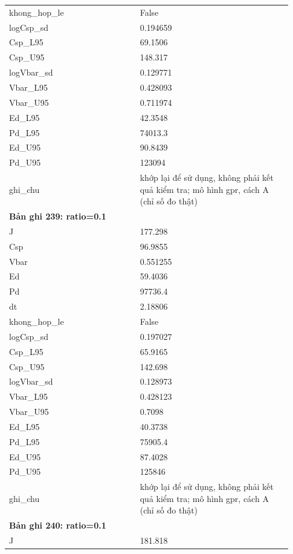 \begin{longtable}{p{0.43\linewidth}p{0.50\linewidth}}
khong\_\allowbreak hop\_\allowbreak le & False \\
logCsp\_\allowbreak sd & 0.194659 \\
Csp\_\allowbreak L95 & 69.1506 \\
Csp\_\allowbreak U95 & 148.317 \\
logVbar\_\allowbreak sd & 0.129771 \\
Vbar\_\allowbreak L95 & 0.428093 \\
Vbar\_\allowbreak U95 & 0.711974 \\
Ed\_\allowbreak L95 & 42.3548 \\
Pd\_\allowbreak L95 & 74013.3 \\
Ed\_\allowbreak U95 & 90.8439 \\
Pd\_\allowbreak U95 & 123094 \\
ghi\_\allowbreak chu & khớp lại để sử dụng, không phải kết quả kiểm tra; mô hình gpr, cách A (chỉ số đo thật) \\
\midrule
\multicolumn{2}{p{0.95\linewidth}}{\textbf{Bản ghi 239: ratio=0.1}} \\
J & 177.298 \\
Csp & 96.9855 \\
Vbar & 0.551255 \\
Ed & 59.4036 \\
Pd & 97736.4 \\
dt & 2.18806 \\
khong\_\allowbreak hop\_\allowbreak le & False \\
logCsp\_\allowbreak sd & 0.197027 \\
Csp\_\allowbreak L95 & 65.9165 \\
Csp\_\allowbreak U95 & 142.698 \\
logVbar\_\allowbreak sd & 0.128973 \\
Vbar\_\allowbreak L95 & 0.428123 \\
Vbar\_\allowbreak U95 & 0.7098 \\
Ed\_\allowbreak L95 & 40.3738 \\
Pd\_\allowbreak L95 & 75905.4 \\
Ed\_\allowbreak U95 & 87.4028 \\
Pd\_\allowbreak U95 & 125846 \\
ghi\_\allowbreak chu & khớp lại để sử dụng, không phải kết quả kiểm tra; mô hình gpr, cách A (chỉ số đo thật) \\
\midrule
\multicolumn{2}{p{0.95\linewidth}}{\textbf{Bản ghi 240: ratio=0.1}} \\
J & 181.818 \\

\end{longtable}
